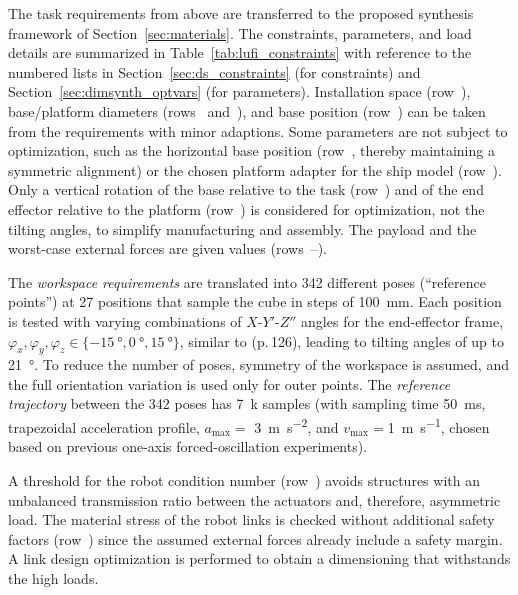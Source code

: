 The task requirements from above are transferred to the proposed synthesis framework of Section~\ref{sec:materials}.
The constraints, parameters, and load details are summarized in Table~\ref{tab:lufi_constraints} with reference to the numbered lists in Section~\ref{sec:ds_constraints} (for constraints) and Section~\ref{sec:dimsynth_optvars} (for parameters).
Installation space (row~), %
%
base/platform diameters (rows~ and~), and base position (row~) can be taken from the requirements with minor adaptions.
Some parameters are not subject to optimization, such as the horizontal base position (row~, thereby maintaining a symmetric alignment) or the chosen platform adapter for the ship model (row~).
Only a vertical rotation of the base relative to the task (row~) and of the end effector relative to the platform (row~) is considered for optimization, not the tilting angles, to simplify manufacturing and assembly.
The payload and the worst-case external forces are given values (rows~--).

The \emph{workspace requirements} are translated into 342 different poses (``reference points'') at 27 positions that sample the cube in steps of \SI{100}{\milli\metre}.
Each position is tested with varying combinations of $X$-$Y'$-$Z''$  angles for the end-effector frame, $\varphi_x,\varphi_y,\varphi_z \in \{\SI{-15}{\degree},\SI{0}{\degree},\SI{15}{\degree}\}$, similar to \cite{Kirchner2000} (p.\,126), leading to tilting angles of up to \SI{21}{\degree}.
To reduce the number of poses, symmetry of the workspace is assumed, and the full orientation variation is used only for outer points.
The \emph{reference trajectory} between {the 342 poses} has 7~k samples (with sampling time \SI{50}{\milli\second}, trapezoidal acceleration profile, $a_\mathrm{max}=$ \SI{3}{\metre\per\square\second}, and $v_\mathrm{max}=$\SI{1}{\metre\per\second}, chosen based on previous one-axis forced-oscillation experiments). %

A threshold for the robot  condition number (row~) avoids structures with an unbalanced transmission ratio between the actuators and, therefore, asymmetric load.
The material stress of the robot links is checked without additional safety factors (row~) since the assumed external forces already include a safety margin.
A link design optimization is performed to obtain a dimensioning that withstands the high loads.

